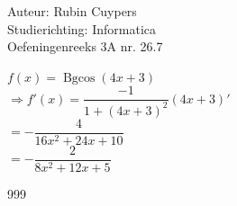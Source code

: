 \documentclass[a4paper]{article}
\newcommand{\Bgcos}{\operatorname{Bgcos}}
\begin{document}
  
\noindent \large Auteur: Rubin Cuypers \\
\noindent \large Studierichting: Informatica\\
\noindent \large Oefeningenreeks 3A nr. 26.7\\

\medskip

\normalsize

$f(x)=\Bgcos (4x+3)$\\

$\Rightarrow f'(x)=\dfrac{-1}{1+(4x+3)^2}(4x+3)'$\\

$=-\dfrac{4}{16x^2+24x+10}$\\

$=-\dfrac{2}{8x^2+12x+5}$



\begin{thebibliography}{999}
\end{thebibliography}
\end{document}

